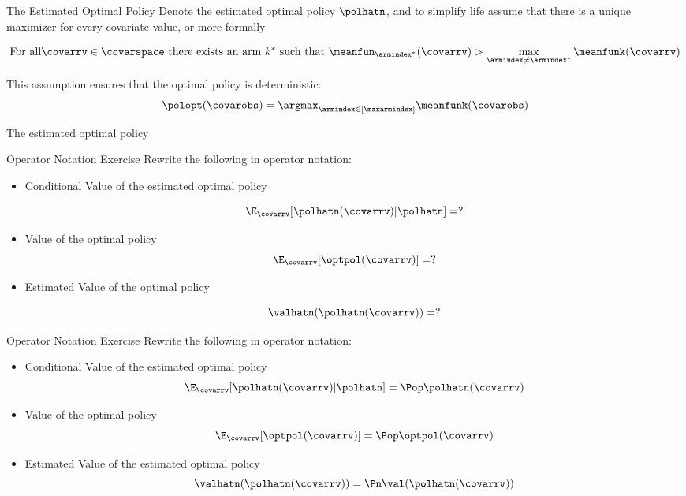\documentclass[aspectratio=169, professionalfonts]{beamer}
\begin{document}
\begin{frame}{The Estimated Optimal Policy}
	Denote the estimated optimal policy $\polhatn$, and to simplify life assume
	that there is a unique maximizer for every covariate value, or more formally

	$$\text{For all} \covarrv \in \covarspace \text{ there exists an arm }k^*
		\text{ such that } \meanfun_{\armindex^*}(\covarrv) > \max_{\armindex \neq
			\armindex^*} \meanfunk(\covarrv)$$

	\vfill \pause
	This assumption ensures that the optimal policy is deterministic:
	$$\polopt(\covarobs) = \argmax_{\armindex \in [\maxarmindex]}\meanfunk(\covarobs)$$

	The estimated optimal policy
\end{frame}


\begin{frame}{Operator Notation Exercise}
	Rewrite the following in operator notation:
	\vfill
	\begin{itemize}

		\item Conditional Value of the estimated optimal policy

		      $$\E_{\covarrv}[\polhatn(\covarrv) \vert \polhatn] = ?$$

		\item Value of the optimal policy
		      $$\E_{\covarrv}[\optpol(\covarrv)] = ?$$

		\item Estimated Value of the optimal policy

		      $$\valhatn(\polhatn(\covarrv)) = ?$$
	\end{itemize}
	\vfill

\end{frame}

\begin{frame}{Operator Notation Exercise}
	Rewrite the following in operator notation:
	\vfill
	\begin{itemize}

		\item Conditional Value of the estimated optimal policy
		      \pause
		      $$\E_{\covarrv}[\polhatn(\covarrv) \vert \polhatn] = \Pop \polhatn(\covarrv)$$
		      \pause
		\item Value of the optimal policy
		      \pause
		      $$\E_{\covarrv}[\optpol(\covarrv)] = \Pop \optpol(\covarrv)$$
		      \pause
		\item Estimated Value of the estimated optimal policy
		      \pause
		      $$\valhatn(\polhatn(\covarrv)) = \Pn \val(\polhatn(\covarrv))$$
	\end{itemize}
	\vfill

\end{frame}
\end{document}
